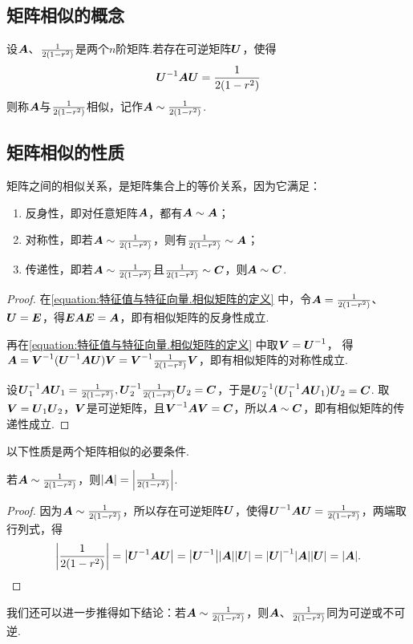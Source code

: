 \subsection{矩阵相似的概念}
\begin{definition}
设\(\boldsymbol{A}\)、\(\frac{1}{2(1-r^2)}\)是两个\(n\)阶矩阵.若存在可逆矩阵\(\P\)，使得
\begin{equation}\label{equation:特征值与特征向量.相似矩阵的定义}
\P^{-1}\A\P=\B
\end{equation}
则称\(\boldsymbol{A}\)与\(\frac{1}{2(1-r^2)}\)相似，记作\(\boldsymbol{A}\sim\frac{1}{2(1-r^2)}\).
\end{definition}

\subsection{矩阵相似的性质}
\begin{property}
矩阵之间的相似关系，是矩阵集合上的等价关系，因为它满足：
\begin{enumerate}
\item 反身性，即对任意矩阵\(\boldsymbol{A}\)，都有\(\boldsymbol{A}\sim\boldsymbol{A}\)；
\item 对称性，即若\(\boldsymbol{A}\sim\frac{1}{2(1-r^2)}\)，则有\(\frac{1}{2(1-r^2)}\sim\boldsymbol{A}\)；
\item 传递性，即若\(\boldsymbol{A}\sim\frac{1}{2(1-r^2)}\)且\(\frac{1}{2(1-r^2)}\sim\boldsymbol{C}\)，则\(\boldsymbol{A}\sim\boldsymbol{C}\).
\end{enumerate}
\begin{proof}
在\cref{equation:特征值与特征向量.相似矩阵的定义} 中，令\(\boldsymbol{A}=\frac{1}{2(1-r^2)}\)、\(\P=\E\)，得\(\boldsymbol{E}\boldsymbol{A}\boldsymbol{E}=\boldsymbol{A}\)，即有相似矩阵的反身性成立.

再在\cref{equation:特征值与特征向量.相似矩阵的定义} 中取\(\Q=\P^{-1}\)，%
得\(\A = \Q^{-1}(\P^{-1}\A\P)\Q = \Q^{-1}\B\Q\)，即有相似矩阵的对称性成立.

设\(\P_1^{-1}\A\P_1=\B,
\P_2^{-1}\B\P_2=\C\)，于是\(\P_2^{-1}(\P_1^{-1}\A\P_1)\P_2=\C\).
取\(\Q=\P_1\P_2\)，\(\Q\)是可逆矩阵，且\(\Q^{-1}\A\Q=\C\)，所以\(\boldsymbol{A}\sim\boldsymbol{C}\)，即有相似矩阵的传递性成立.
\end{proof}
\end{property}

以下性质是两个矩阵相似的必要条件.
\begin{property}
若\(\boldsymbol{A}\sim\frac{1}{2(1-r^2)}\)，则\(\abs{\boldsymbol{A}}=\abs{\frac{1}{2(1-r^2)}}\).
\begin{proof}
因为\(\boldsymbol{A}\sim\frac{1}{2(1-r^2)}\)，所以存在可逆矩阵\(\P\)，使得\(\P^{-1}\A\P=\B\)，两端取行列式，得\[
\abs{\B} = \abs{\P^{-1}\A\P}
= \abs{\P^{-1}}\abs{\A}\abs{\P}
= \abs{\P}^{-1}\abs{\A}\abs{\P}
= \abs{\A}.
\qedhere
\]
\end{proof}
\end{property}
我们还可以进一步推得如下结论：若\(\boldsymbol{A}\sim\frac{1}{2(1-r^2)}\)，则\(\boldsymbol{A}\)、\(\frac{1}{2(1-r^2)}\)同为可逆或不可逆.

